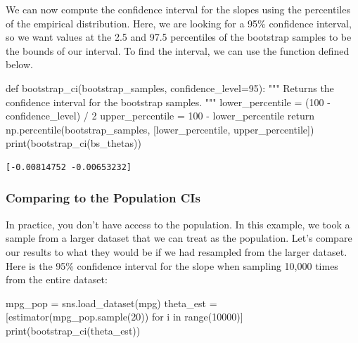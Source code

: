 \documentclass[
  letterpaper,
  DIV=11,
  numbers=noendperiod]{scrreprt}
\newenvironment{Shaded}{\begin{snugshade}}{\end{snugshade}}
\newcommand{\BuiltInTok}[1]{\textcolor[rgb]{0.00,0.23,0.31}{#1}}
\newcommand{\CommentTok}[1]{\textcolor[rgb]{0.37,0.37,0.37}{#1}}
\newcommand{\ControlFlowTok}[1]{\textcolor[rgb]{0.00,0.23,0.31}{#1}}
\newcommand{\DecValTok}[1]{\textcolor[rgb]{0.68,0.00,0.00}{#1}}
\newcommand{\KeywordTok}[1]{\textcolor[rgb]{0.00,0.23,0.31}{#1}}
\newcommand{\NormalTok}[1]{\textcolor[rgb]{0.00,0.23,0.31}{#1}}
\newcommand{\OperatorTok}[1]{\textcolor[rgb]{0.37,0.37,0.37}{#1}}
\newcommand{\StringTok}[1]{\textcolor[rgb]{0.13,0.47,0.30}{#1}}
\begin{document}
We can now compute the confidence interval for the slopes using the
percentiles of the empirical distribution. Here, we are looking for a
95\% confidence interval, so we want values at the 2.5 and 97.5
percentiles of the bootstrap samples to be the bounds of our interval.
To find the interval, we can use the function defined below.

\begin{Shaded}
\begin{Highlighting}[]
\KeywordTok{def}\NormalTok{ bootstrap\_ci(bootstrap\_samples, confidence\_level}\OperatorTok{=}\DecValTok{95}\NormalTok{):}
    \CommentTok{"""}
\CommentTok{    Returns the confidence interval for the bootstrap samples.}
\CommentTok{    """}
\NormalTok{    lower\_percentile }\OperatorTok{=}\NormalTok{ (}\DecValTok{100} \OperatorTok{{-}}\NormalTok{ confidence\_level) }\OperatorTok{/} \DecValTok{2}
\NormalTok{    upper\_percentile }\OperatorTok{=} \DecValTok{100} \OperatorTok{{-}}\NormalTok{ lower\_percentile}
    \ControlFlowTok{return}\NormalTok{ np.percentile(bootstrap\_samples, [lower\_percentile, upper\_percentile])}
\BuiltInTok{print}\NormalTok{(bootstrap\_ci(bs\_thetas))}
\end{Highlighting}
\end{Shaded}

\begin{verbatim}
[-0.00814752 -0.00653232]
\end{verbatim}

\subsubsection{Comparing to the Population
CIs}\label{comparing-to-the-population-cis}

In practice, you don't have access to the population. In this example,
we took a sample from a larger dataset that we can treat as the
population. Let's compare our results to what they would be if we had
resampled from the larger dataset. Here is the 95\% confidence interval
for the slope when sampling 10,000 times from the entire dataset:

\begin{Shaded}
\begin{Highlighting}[]
\NormalTok{mpg\_pop }\OperatorTok{=}\NormalTok{ sns.load\_dataset(}\StringTok{\textquotesingle{}mpg\textquotesingle{}}\NormalTok{)}
\NormalTok{theta\_est }\OperatorTok{=}\NormalTok{ [estimator(mpg\_pop.sample(}\DecValTok{20}\NormalTok{)) }\ControlFlowTok{for}\NormalTok{ i }\KeywordTok{in} \BuiltInTok{range}\NormalTok{(}\DecValTok{10000}\NormalTok{)]}
\BuiltInTok{print}\NormalTok{(bootstrap\_ci(theta\_est))}
\end{Highlighting}
\end{Shaded}
\end{document}
